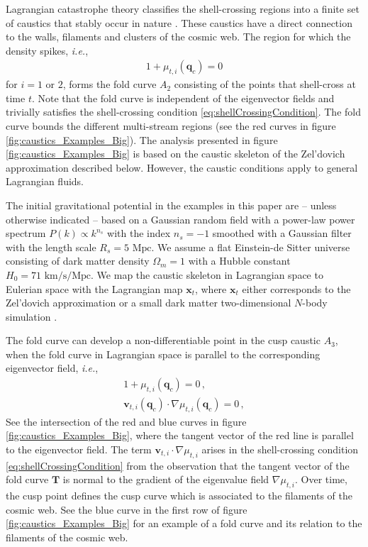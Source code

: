 \documentclass[a4paper, 11pt]{article}
\begin{document}
Lagrangian catastrophe theory classifies the shell-crossing regions into a finite set of caustics that stably occur in nature \cite{Arnold:1972, Arnold:1976, Poston:1978, Gilmore:1981, Kravtsov:1983, Arnold:1984, Arnold:2012a, Arnold:2012b}. These caustics have a direct connection to the walls, filaments and clusters of the cosmic web. The region for which the density spikes, \textit{i.e.}, 
\begin{align}
1+\mu_{t,i}(\bm{q}_c)=0
\end{align}
for $i=1$ or $2$, forms the fold curve $A_2$ consisting of the points that shell-cross at time $t$. Note that the fold curve is independent of the eigenvector fields and trivially satisfies the shell-crossing condition \eqref{eq:shellCrossingCondition}. The fold curve bounds the different multi-stream regions (see the red curves in figure \ref{fig:caustics_Examples_Big}). The analysis presented in figure \ref{fig:caustics_Examples_Big} is based on the caustic skeleton of the Zel'dovich approximation described below. However, the caustic conditions apply to general Lagrangian fluids. 

The initial gravitational potential in the examples in this paper are -- unless otherwise indicated -- based on a Gaussian random field with a power-law power spectrum $P(k) \propto k^{n_s}$ with the index $n_s=-1$ smoothed with a Gaussian filter with the length scale $R_s = 5\text{ Mpc}$. We assume a flat Einstein-de Sitter universe consisting of dark matter density $\Omega_m=1$ with a Hubble constant $H_0=71\text{ km/s/Mpc}$. We map the caustic skeleton in Lagrangian space to Eulerian space with the Lagrangian map $\bm{x}_t$, where $\bm{x}_t$ either corresponds to the Zel'dovich approximation or a small dark matter two-dimensional $N$-body simulation \cite{Hidding:2020}.

The fold curve can develop a non-differentiable point in the cusp caustic $A_3$, when the fold curve in Lagrangian space is parallel to the corresponding eigenvector field, \textit{i.e.}, 
\begin{align}
1+\mu_{t,i}(\bm{q}_c)=0\,,\\
\bm{v}_{t,i}(\bm{q}_c) \cdot \nabla \mu_{t,i}(\bm{q}_c)=0\,,\label{eq:cuspCondition}
\end{align}
See the intersection of the red and blue curves in figure \ref{fig:caustics_Examples_Big}, where the tangent vector of the red line is parallel to the eigenvector field. The term $\bm{v}_{t,i} \cdot \nabla \mu_{t,i}$ arises in the shell-crossing condition \eqref{eq:shellCrossingCondition} from the observation that the tangent vector of the fold curve $\bm{T}$ is normal to the gradient of the eigenvalue field $\nabla \mu_{t,i}$. Over time, the cusp point defines the cusp curve which is associated to the filaments of the cosmic web. See the blue curve in the first row of figure \ref{fig:caustics_Examples_Big} for an example of a fold curve and its relation to the filaments of the cosmic web. 
\end{document}
